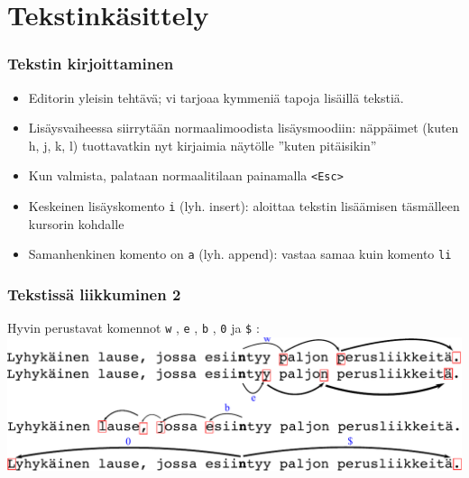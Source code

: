 \documentclass[]{beamer}
\newcommand{\Tohj}[1]{\texttt{#1}}
\newcommand{\com}[1]{{\color{blue!50!black}\Tohj{#1}} \!\!}
\begin{document}
\section{Tekstinkäsittely}

\begin{frame}
    \frametitle{Tekstin kirjoittaminen}
    \begin{itemize} 
        \item Editorin yleisin tehtävä; vi tarjoaa kymmeniä tapoja lisäillä tekstiä.
        \item Lisäysvaiheessa siirrytään normaalimoodista lisäysmoodiin: näppäimet (kuten h, j, k, l) tuottavatkin nyt kirjaimia näytölle ''kuten pitäisikin''
        \pause
        \item Kun valmista, palataan normaalitilaan painamalla \com{<Esc>}
        \pause
        \item Keskeinen lisäyskomento \com{i} (lyh. insert): aloittaa tekstin lisäämisen täsmälleen kursorin kohdalle
        \item Samanhenkinen komento on \com{a} (lyh. append): vastaa samaa kuin komento \com{li}
    \end{itemize}
\end{frame}

\begin{frame}
    \frametitle{Tekstissä liikkuminen 2}
    Hyvin perustavat komennot \com{w}, \com{e}, \com{b}, \com{0} ja \com{\$}:
    \includegraphics[width=\textwidth]{vi_liikekomennot_web0}
\end{frame}
\end{document}
